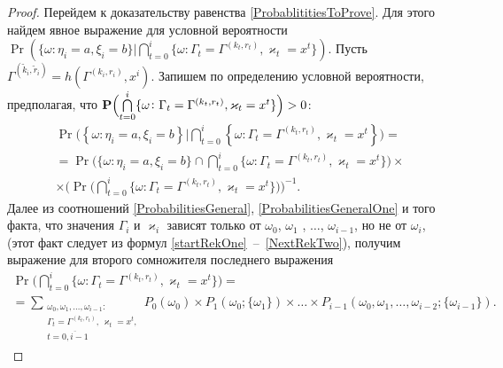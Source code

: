 \documentclass[a4paper,12pt,russian]{extarticle}
\begin{document}
\begin{proof}
Перейдем к доказательству равенства \eqref{ProbablititiesToProve}. Для этого найдем явное выражение для условной вероятности $\Pr (\{ \omega \colon \eta_i = a, \xi_i=b\} | \bigcap_{t=0}^{i}\{\omega\colon \Gamma_t=\Gamma^{(k_t,r_t)}, \varkappa_t=x^t\})$. Пусть $\Gamma^{(\tilde{k}_i,\tilde{r}_i)}=h(\Gamma^{(k_i,r_i)},x^i)$. Запишем по определению условной вероятности, предполагая, что $\Pr\Bigl(\bigcap\limits_{t=0}^{i}\{\omega\colon \Gamma_t=\Gamma^{(k_t,r_t)}, \varkappa_t=x^t\}\Bigr)>0$:
\begin{multline}
\Pr \biggl(\left\{ \omega \colon \eta_i = a, \xi_i=b\right\}  \bigg| \bigcap_{t=0}^{i}\left\{\omega\colon \Gamma_t=\Gamma^{(k_t,r_t)}, \varkappa_t=x^t\right\}\biggr) = \\
=\Pr\biggl(\{ \omega \colon \eta_i = a, \xi_i=b \} \cap \bigcap_{t=0}^{i}\{\omega\colon \Gamma_t=\Gamma^{(k_t,r_t)}, \varkappa_t=x^t\}\biggr) \times \\
\times
\biggl(\Pr\biggl( \bigcap_{t=0}^{i}\{\omega\colon \Gamma_t=\Gamma^{(k_t,r_t)}, \varkappa_t=x^t\}\biggr)\biggr)^{-1}.
\label{Construction:1}
\end{multline}
Далее из соотношений \eqref{ProbabilitiesGeneral}, \eqref{ProbabilitiesGeneralOne} и того факта, что значения $\Gamma_i$ и $\varkappa_{i}$ зависят только от $\omega_0$, $\omega_1$ , $\ldots$, $\omega_{i-1}$, но не от $\omega_i$, (этот факт следует из формул \eqref{startRekOne}~--~\eqref{NextRekTwo}), получим выражение для второго сомножителя последнего выражения
\begin{multline}
\Pr\biggl( \bigcap_{t=0}^{i}\{\omega\colon \Gamma_t=\Gamma^{(k_t,r_t)}, \varkappa_t=x^t\}\biggr)=\\
=\sum_{\substack{\omega_0, \omega_1,\ldots, \omega_{i-1} \colon \\ \Gamma_t=\Gamma^{(k_t,r_t)},\, \varkappa_t=x^t,\\ t=\overline{0,i-1}}} P_0(\omega_0)\times P_1(\omega_0;\{\omega_1\})\times\ldots\times P_{i-1}(\omega_0,\omega_1,\ldots, \omega_{i-2};\{\omega_{i-1}\}).
\label{Construction:2}
\end{multline}


\end{proof}
\end{document}
